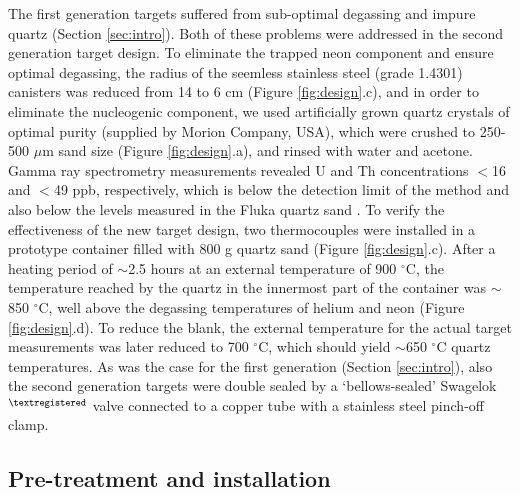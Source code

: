 \documentclass{article}
\begin{document}
The first  generation targets suffered from  sub-optimal degassing and
impure quartz (Section \ref{sec:intro}).   Both of these problems were
addressed in  the second generation  target design.  To  eliminate the
trapped neon component and ensure optimal degassing, the radius of the
seemless stainless steel (grade  1.4301) canisters was reduced from 14
to 6  cm (Figure  \ref{fig:design}.c), and in  order to  eliminate the
nucleogenic component,  we used artificially grown  quartz crystals of
optimal purity  (supplied by Morion Company, USA),  which were crushed
to 250-500  $\mu$m sand  size (Figure \ref{fig:design}.a),  and rinsed
with water and acetone.   Gamma ray spectrometry measurements revealed
U and  Th concentrations $<$16  and $<$49 ppb, respectively,  which is
below  the detection limit  of the  method and  also below  the levels
measured in the Fluka  quartz sand \citep{strasky2008}.  To verify the
effectiveness  of  the  new  target  design,  two  thermocouples  were
installed  in a  prototype container  filled  with 800  g quartz  sand
(Figure  \ref{fig:design}.c).   After a  heating  period of  $\sim$2.5
hours at  an external temperature of 900  $^{\circ}$C, the temperature
reached  by the  quartz in  the innermost  part of  the  container was
$\sim$850 $^{\circ}$C, well above the degassing temperatures of helium
and   neon  \citep[$<$  600   $^{\circ}$C,][]{niedermann2002}  (Figure
\ref{fig:design}.d).   To reduce the  blank, the  external temperature
for  the   actual  target  measurements  was  later   reduced  to  700
$^{\circ}$C,   which  should   yield   $\sim$650  $^{\circ}$C   quartz
temperatures.   As was  the  case for  the  first generation  (Section
\ref{sec:intro}),  also  the  second  generation targets  were  double
sealed  by a `bellows-sealed'  Swagelok$^{\tiny\textregistered}$ valve
connected to a copper tube with a stainless steel pinch-off clamp.

\subsection{Pre-treatment and installation}\label{sec:installation}
\end{document}
